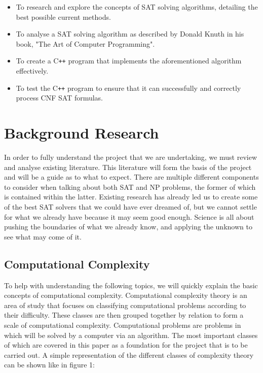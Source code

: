 \documentclass{article}
\begin{document}
\begin{itemize}
    \item To research and explore the concepts of SAT solving algorithms, detailing the best possible current methods.
    \item To analyse a SAT solving algorithm as described by Donald Knuth in his book, "The Art of Computer Programming".
    \item To create a C\texttt{++} program that implements the aforementioned algorithm effectively.
    \item To test the C\texttt{++} program to ensure that it can successfully and correctly process CNF SAT formulas.
\end{itemize}

\newpage
\section{Background Research}
In order to fully understand the project that we are undertaking, we must review and analyse existing literature. This literature will form
the basis of the project and will be a guide as to what to expect. There are multiple different components to consider when talking about
both SAT and NP problems, the former of which is contained within the latter. Existing research has already led us to create some of the
best SAT solvers that we could have ever dreamed of, but we cannot settle for what we already have because it may seem good enough. Science
is all about pushing the boundaries of what we already know, and applying the unknown to see what may come of it.

\subsection{Computational Complexity}
To help with understanding the following topics, we will quickly explain the basic concepts of computational complexity. Computational
complexity theory is an area of study that focuses on classifying computational problems according to their difficulty. These classes are
then grouped together by relation to form a scale of computational complexity. Computational problems are problems in which will be solved
by a computer via an algorithm. The most important classes of which are covered in this paper as a foundation for the project that is to be
carried out. A simple representation of the different classes of complexity theory can be shown like in figure 1:
\end{document}
